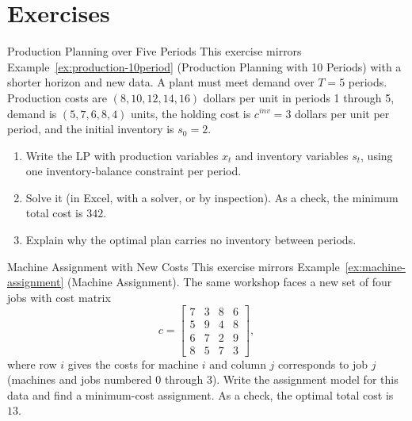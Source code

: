 \section{Exercises}


\begin{ex}{Production Planning over Five Periods}{}
\label{ex:production-5period-warmup}
 This exercise mirrors Example~\ref{ex:production-10period} (Production Planning with 10 Periods) with a shorter horizon and new data.  A plant must meet demand over $T = 5$ periods.  Production costs are $(8, 10, 12, 14, 16)$ dollars per unit in periods 1 through 5, demand is $(5, 7, 6, 8, 4)$ units, the holding cost is $c^{inv} = 3$ dollars per unit per period, and the initial inventory is $s_0 = 2$.
\begin{enumerate}
\item Write the LP with production variables $x_t$ and inventory variables $s_t$, using one inventory-balance constraint per period.
\item Solve it (in Excel, with a solver, or by inspection).  As a check, the minimum total cost is $342$.
\item Explain why the optimal plan carries no inventory between periods.
\end{enumerate}
\end{ex}

\begin{ex}{Machine Assignment with New Costs}{}
\label{ex:machine-assignment-warmup}
 This exercise mirrors Example~\ref{ex:machine-assignment} (Machine Assignment).  The same workshop faces a new set of four jobs with cost matrix
\[
c = \begin{bmatrix} 7 & 3 & 8 & 6 \\ 5 & 9 & 4 & 8 \\ 6 & 7 & 2 & 9 \\ 8 & 5 & 7 & 3 \end{bmatrix},
\]
where row $i$ gives the costs for machine $i$ and column $j$ corresponds to job $j$ (machines and jobs numbered $0$ through $3$).  Write the assignment model for this data and find a minimum-cost assignment.  As a check, the optimal total cost is $13$.
\end{ex}

